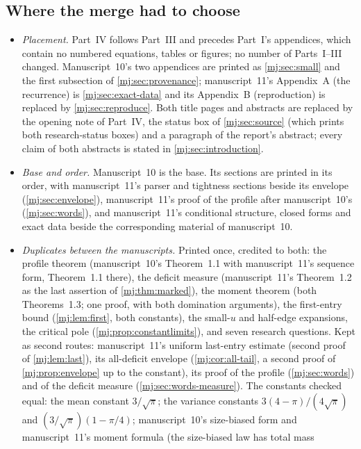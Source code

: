 \documentclass[11pt,a4paper]{article}
\theoremstyle{definition}\newaliascnt{definition}{theorem}
\theoremstyle{remark}\newaliascnt{remark}{theorem}
\begin{document}
\subsection{Where the merge had to choose}
\label{mj:sec:merge}
\begin{itemize}
\item \emph{Placement.} Part~IV follows Part~III and precedes Part~I's
 appendices, which contain no numbered equations, tables or figures; no
 number of Parts~I--III changed. Manuscript~10's two appendices are printed as
 \cref{mj:sec:small} and the first subsection of \cref{mj:sec:provenance};
 manuscript~11's Appendix~A (the recurrence) is \cref{mj:sec:exact-data} and
 its Appendix~B (reproduction) is replaced by \cref{mj:sec:reproduce}. Both
 title pages and abstracts are replaced by the opening note of Part~IV, the
 status box of \cref{mj:sec:source} (which prints both research-status
 boxes) and a paragraph of the report's abstract; every claim of both
 abstracts is stated in \cref{mj:sec:introduction}.
\item \emph{Base and order.} Manuscript~10 is the base. Its sections are
 printed in its order, with manuscript~11's parser and tightness sections
 beside its envelope (\cref{mj:sec:envelope}), manuscript~11's proof of the
 profile after manuscript~10's (\cref{mj:sec:words}), and manuscript~11's
 conditional structure, closed forms and exact data beside the corresponding
 material of manuscript~10.
\item \emph{Duplicates between the manuscripts.} Printed once, credited to
 both: the profile theorem (manuscript~10's Theorem~1.1 with manuscript~11's
 sequence form, Theorem~1.1 there), the deficit measure (manuscript~11's
 Theorem~1.2 as the last assertion of \cref{mj:thm:marked}), the moment
 theorem (both Theorems~1.3; one proof, with both domination arguments), the
 first-entry bound (\cref{mj:lem:first}, both constants), the small-$u$ and
 half-edge expansions, the critical pole (\cref{mj:prop:constantlimits}), and
 seven research questions. Kept as second routes: manuscript~11's uniform
 last-entry estimate (second proof of \cref{mj:lem:last}), its all-deficit
 envelope (\cref{mj:cor:all-tail}, a second proof of
 \cref{mj:prop:envelope} up to the constant), its proof of the profile
 (\cref{mj:sec:words}) and of the deficit measure
 (\cref{mj:sec:words-measure}). The constants checked equal: the mean
 constant $3/\sqrt\pi$; the variance constants $3(4-\pi)/(4\sqrt\pi)$ and
 $(3/\sqrt\pi)(1-\pi/4)$; manuscript~10's size-biased form and
 manuscript~11's moment formula (the size-biased law has total mass

\end{itemize}
\end{document}
